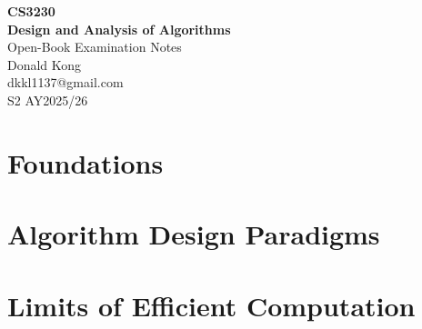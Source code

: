 \documentclass[11pt]{article}
\begin{document}
\thispagestyle{empty}
\bigskip
\vspace{0.1cm}

\begin{center}
{\fontsize{30}{30}\selectfont\bfseries\sffamily CS3230\\[0.4em]
Design and Analysis of Algorithms}\\
\vspace{18pt}
{\fontsize{14}{14}\selectfont\rmfamily Open-Book Examination Notes}\\
\vspace{18pt}
{\fontsize{14}{14}\selectfont\rmfamily Donald Kong}\\
\vspace{6pt}
{\fontsize{12}{12}\selectfont\ttfamily dkkl1137@gmail.com}\\
\vspace{18pt}
{\fontsize{11}{11}\selectfont\rmfamily S2 AY2025/26}
\end{center}

\vspace{1cm}

\microtoc%
\newpage


\newpage

\part{Foundations}





\part{Algorithm Design Paradigms}







\part{Limits of Efficient Computation}



\appendix


\printindex

\newpage
\listoftheorems[ignoreall, show={theorem,lemma,corollary,proposition}]
\end{document}
